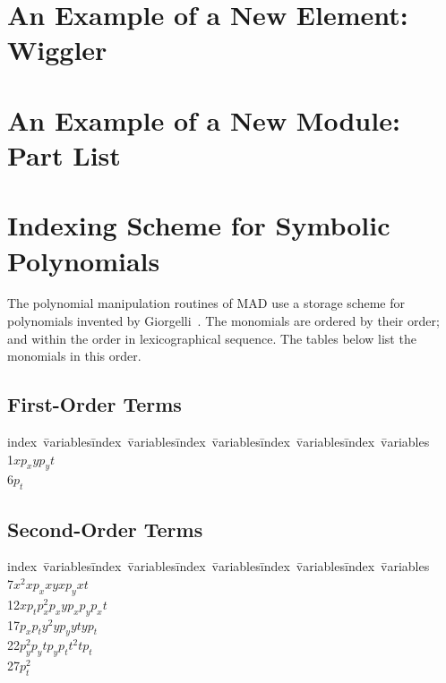 
\appendix

\chapter{An Example of a New Element: Wiggler}

\chapter{An Example of a New Module: Part List}


\chapter{Indexing Scheme for Symbolic Polynomials}
\label{giorgelli}
The polynomial manipulation routines of MAD use a storage scheme for
polynomials invented by Giorgelli~\cite{GIORG}.
The monomials are ordered by their order;
and within the order in lexicographical sequence.
The tables below list the monomials in this order.

\section{First-Order Terms}
\indent
\begin{tabbing}
index\ \=variables\kern1cm\=index\ \=variables\kern1cm\=
index\ \=variables\kern1cm\=index\ \=variables\kern1cm\=
index\ \=variables\\
  1\>$x                 $\>$p_x               $\>$y                 $\>$p_y               $\>$t                 $\\
  6\>$p_t               $
\end{tabbing}

\section{Second-Order Terms}
\indent
\begin{tabbing}
index\ \=variables\kern1cm\=index\ \=variables\kern1cm\=
index\ \=variables\kern1cm\=index\ \=variables\kern1cm\=
index\ \=variables\\
  7\>$x  ^2             $\>$x  p_x            $\>$x  y              $\>$x  p_y            $\>$x  t              $\\
 12\>$x  p_t            $\>$p_x^2             $\>$p_xy              $\>$p_xp_y            $\>$p_xt              $\\
 17\>$p_xp_t            $\>$y  ^2             $\>$y  p_y            $\>$y  t              $\>$y  p_t            $\\
 22\>$p_y^2             $\>$p_yt              $\>$p_yp_t            $\>$t  ^2             $\>$t  p_t            $\\
 27\>$p_t^2             $
\end{tabbing}

